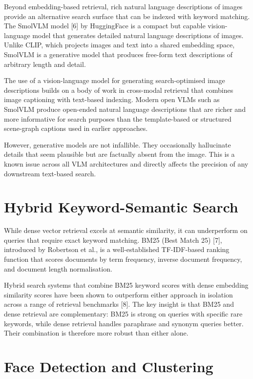 \documentclass[12pt,a4paper,oneside]{report}
\begin{document}
Beyond embedding-based retrieval, rich natural language descriptions of images provide an alternative search surface that can be indexed with keyword matching. The SmolVLM model [6] by HuggingFace is a compact but capable vision-language model that generates detailed natural language descriptions of images. Unlike CLIP, which projects images and text into a shared embedding space, SmolVLM is a generative model that produces free-form text descriptions of arbitrary length and detail.

The use of a vision-language model for generating search-optimised image descriptions builds on a body of work in cross-modal retrieval that combines image captioning with text-based indexing. Modern open VLMs such as SmolVLM produce open-ended natural language descriptions that are richer and more informative for search purposes than the template-based or structured scene-graph captions used in earlier approaches.

However, generative models are not infallible. They occasionally hallucinate details that seem plausible but are factually absent from the image. This is a known issue across all VLM architectures and directly affects the precision of any downstream text-based search.

\section{Hybrid Keyword-Semantic Search}

While dense vector retrieval excels at semantic similarity, it can underperform on queries that require exact keyword matching. BM25 (Best Match 25) [7], introduced by Robertson et al., is a well-established TF-IDF-based ranking function that scores documents by term frequency, inverse document frequency, and document length normalisation.

Hybrid search systems that combine BM25 keyword scores with dense embedding similarity scores have been shown to outperform either approach in isolation across a range of retrieval benchmarks [8]. The key insight is that BM25 and dense retrieval are complementary: BM25 is strong on queries with specific rare keywords, while dense retrieval handles paraphrase and synonym queries better. Their combination is therefore more robust than either alone.

\section{Face Detection and Clustering}
\end{document}
